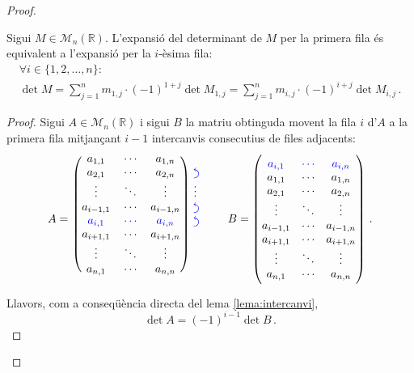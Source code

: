 \begin{teo}
\begin{proof}
\begin{lema}\label{lema:iesimafila}
Sigui $M\in\mathcal{M}_n(\mathbb{R})$. L'expansió del determinant de $M$ per la primera fila és equivalent a l'expansió per la $i$-èsima fila:
\begin{multline*}
	\forall i \in \{1,2,\ldots, n\}:\\
	\det M = \sum_{j=1}^{n} m_{1,j}\cdot(-1)^{1+j}\det M_{1,j} = \sum_{j=1}^{n} m_{i,j}\cdot(-1)^{i+j}\det M_{i,j}\,.
\end{multline*}
	\begin{adjustwidth}{0.8cm}{}
	\begin{proof}
		Sigui $A\in\mathcal{M}_n(\mathbb{R})$ i sigui $B$ la matriu obtinguda movent la fila $i$ d'$A$ a la primera fila mitjançant $i-1$ intercanvis consecutius de files adjacents:
		\[
		A =\
		\begin{blockarray}{cccc}
		\begin{block}{(ccc)*{1}{>{\color{blue}}l<{}}}
		a_{1,1}&	\cdots&		a_{1,n}& 		\\
		a_{2,1}&	\cdots&		a_{2,n}& 		\ucarr\\
		\vdots&		\ddots&		\vdots& 		\vdots\\
		a_{i-1,1}&	\cdots&		a_{i-1,n}&    	\ucarr \\
		\bl a_{i,1}&\bl\cdots&	\bl a_{i,n}&    \ucarr \\
		a_{i+1,1}&	\cdots&		a_{i+1,n}&    	\\
		\vdots&		\ddots&		\vdots& 		\\
		a_{n,1}&	\cdots&		a_{n,n}& 		\\	
		\end{block}
		\end{blockarray}
%
		\qquad
%
		B =
		\begin{pmatrix}
		\bl a_{i,1}&\bl\cdots&	\bl a_{i,n}\\
		a_{1,1}&	\cdots&		a_{1,n}\\
		a_{2,1}&	\cdots&		a_{2,n}\\
		\vdots&		\ddots&		\vdots\\
		a_{i-1,1}&	\cdots&		a_{i-1,n}\\
		a_{i+1,1}&	\cdots&		a_{i+1,n}\\
		\vdots&		\ddots&		\vdots\\
		a_{n,1}&	\cdots&		a_{n,n}\\
		\end{pmatrix}\,.
		\]
		Llavors, com a conseqüència directa del lema \ref{lema:intercanvi}, 
		\begin{equation}\label{eq:detrel}
			\det A = (-1)^{i-1}\det B\,.
		\end{equation}
		

\end{proof}
\end{adjustwidth}
\end{lema}
\end{proof}
\end{teo}
